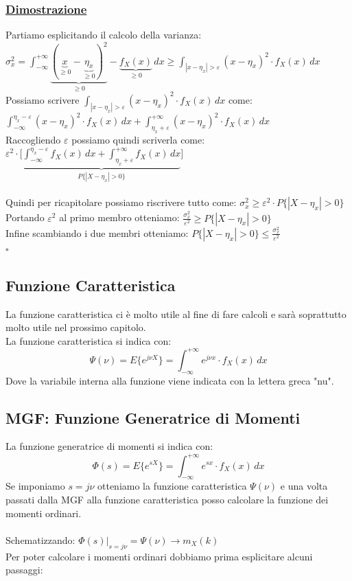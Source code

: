 \documentclass{article}
\begin{document}
\subsubsection{\underline{Dimostrazione}}
Partiamo esplicitando il calcolo della varianza: \\
$\sigma_x^2 = \int_{-\infty}^{+\infty} \underset{\geq 0}{\underbrace{(\underset{\geq 0}{\underbrace{x}} - \underset{\geq 0}{\underbrace{\eta_x}} )^2}} - \underset{\geq 0}{\underbrace{f_X(x)}} \,dx \geq \int_{|x-\eta_x|> \varepsilon} (x-\eta_x)^2 \cdot f_X(x)\,dx$ \\
Possiamo scrivere $\int_{|x-\eta_x|> \varepsilon} (x-\eta_x)^2 \cdot f_X(x)\,dx$ come: 
$\int_{-\infty}^{\eta_x- \varepsilon} (x-\eta_x)^2 \cdot f_X(x) \,dx + \int_{\eta_x+ \varepsilon}^{+\infty} (x-\eta_x)^2 \cdot f_X(x) \,dx$ \\
Raccogliendo $\varepsilon$ possiamo quindi scriverla come: $\varepsilon^2 \cdot \Bigg[ \underset{P\big\{|X-\eta_x| > 0\big\}}{\underbrace{\int_{-\infty}^{\eta_x- \varepsilon} f_X(x) \,dx + \int_{\eta_x+ \varepsilon}^{+\infty} f_X(x) \,dx}} \Bigg]$ \\ \\
Quindi per ricapitolare possiamo riscrivere tutto come: $\sigma_x^2 \geq \varepsilon^2 \cdot P\big\{ |X-\eta_x| > 0 \big\}$ \\
Portando $\varepsilon^2$ al primo membro otteniamo: $\frac{\sigma_x^2}{\varepsilon^2} \geq P\big\{ |X-\eta_x| > 0 \big\}$ \\
Infine scambiando i due membri otteniamo: $P\big\{ |X-\eta_x| > 0 \big\} \leq \frac{\sigma_x^2}{\varepsilon^2} $ \\
\hspace*{0pt}\hfill $\square$ 

\subsection{Funzione Caratteristica}
La funzione caratteristica ci è molto utile al fine di fare calcoli e sarà soprattutto molto utile nel prossimo capitolo. \\
La funzione caratteristica si indica con:
\[\Psi(\nu) = E \big\{ e^{j \nu X} \big\} = \int_{-\infty}^{+\infty} e^{j\nu x} \cdot f_X(x) \,dx\]
Dove la variabile interna alla funzione viene indicata con la lettera greca "nu".

\subsection{MGF: Funzione Generatrice di Momenti}
La funzione generatrice di momenti si indica con:
\[\Phi(s) = E \big\{ e^{sX} \big\} = \int_{-\infty}^{+\infty} e^{sx} \cdot f_X(x) \,dx\]
Se imponiamo $s = j \nu$ otteniamo la funzione caratteristica $\Psi(\nu)$ e una volta passati dalla MGF alla funzione caratteristica posso calcolare la funzione dei momenti ordinari. \\ \\
Schematizzando: $\Phi(s)\big|_{s = j \nu} = \Psi(\nu) \rightarrow m_X(k)$ \\
Per poter calcolare i momenti ordinari dobbiamo prima esplicitare alcuni passaggi:
\end{document}
